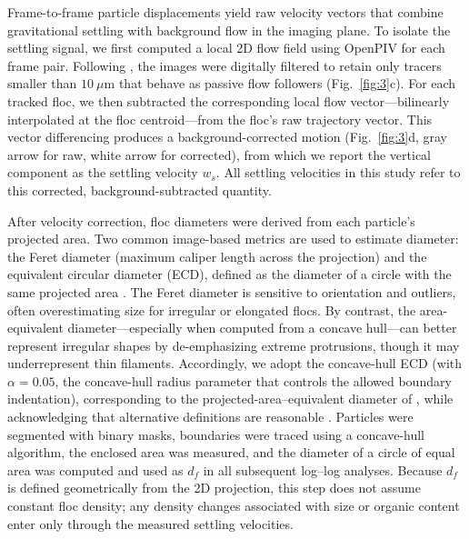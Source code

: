 \documentclass{agujournal2019}
\providecommand{\DIFadd}[1]{{\protect\color{blue} #1}} %
\providecommand{\DIFdel}[1]{{\protect\color{red}\sout{#1}}} %
\providecommand{\DIFaddbegin}{\protect\color{blue}} %
\providecommand{\DIFaddend}{\protect\color{black}} %
\providecommand{\DIFdelbegin}{\protect\color{red}} %
\providecommand{\DIFdelend}{\protect\color{black}} %
\newcommand{\DIFscaledelfig}{0.5}
\newlength{\DIFdelgraphicswidth} %
\newlength{\DIFdelgraphicsheight} %
\newcommand{\DIFaddincludegraphics}[2][]{{\color{blue}\fbox{\DIFOincludegraphics[#1]{#2}}}} %
\newcommand{\DIFdelincludegraphics}[2][]{%
\sbox{\DIFdelgraphicsbox}{\DIFOincludegraphics[#1]{#2}}%
\settoboxwidth{\DIFdelgraphicswidth}{\DIFdelgraphicsbox} %
\settoboxtotalheight{\DIFdelgraphicsheight}{\DIFdelgraphicsbox} %
\scalebox{\DIFscaledelfig}{%
\parbox[b]{\DIFdelgraphicswidth}{\usebox{\DIFdelgraphicsbox}\\[-\baselineskip] \rule{\DIFdelgraphicswidth}{0em}}\llap{\resizebox{\DIFdelgraphicswidth}{\DIFdelgraphicsheight}{%
\setlength{\unitlength}{\DIFdelgraphicswidth}%
\begin{picture}(1,1)%
\thicklines\linethickness{2pt} %
{\color[rgb]{1,0,0}\put(0,0){\framebox(1,1){}}}%
{\color[rgb]{1,0,0}\put(0,0){\line( 1,1){1}}}%
{\color[rgb]{1,0,0}\put(0,1){\line(1,-1){1}}}%
\end{picture}%
}\hspace*{3pt}}} %
} %
\DeclareRobustCommand{\DIFaddbegin}{\DIFOaddbegin \let\includegraphics\DIFaddincludegraphics} %
\DeclareRobustCommand{\DIFaddend}{\DIFOaddend \let\includegraphics\DIFOincludegraphics} %
\DeclareRobustCommand{\DIFdelbegin}{\DIFOdelbegin \let\includegraphics\DIFdelincludegraphics} %
\DeclareRobustCommand{\DIFdelend}{\DIFOaddend \let\includegraphics\DIFOincludegraphics} %
\begin{document}
Frame-to-frame particle displacements yield raw \DIFdelbegin \DIFdel{two-dimensional }\DIFdelend \DIFaddbegin \DIFadd{2D }\DIFaddend velocity vectors that combine gravitational settling with background flow in the imaging plane. To isolate the settling signal, we first computed a local 2D flow field using OpenPIV \cite{liberzon2021openpiv} for each frame pair. Following , the images were digitally filtered to retain only tracers smaller than $10~\mu\mathrm{m}$ that behave as passive flow followers (Fig.~\ref{fig:3}c). For each tracked floc, we then subtracted the corresponding local flow vector---bilinearly interpolated at the floc centroid---from the floc's raw trajectory vector. This vector differencing produces a background-corrected motion (Fig.~\ref{fig:3}d, gray arrow for raw, white arrow for corrected), from which we report the vertical component as the settling velocity \(w_s\). All settling velocities in this study refer to this corrected, background-subtracted quantity.

After velocity correction, floc diameters were derived from each particle's projected area. Two common image-based metrics are used to estimate diameter: the Feret diameter (maximum caliper length across the projection) and the equivalent circular diameter (ECD), defined as the diameter of a circle with the same projected area \cite{jarvis2005measuring, smith2015image}. The Feret diameter is sensitive to orientation and outliers, often overestimating size for irregular or elongated flocs. By contrast, the area-equivalent diameter---especially when computed from a concave hull---can better represent irregular shapes by de-emphasizing extreme protrusions, though it may underrepresent thin filaments. Accordingly, we adopt the concave-hull ECD (with $\alpha = 0.05$, the concave-hull radius parameter that controls the allowed boundary indentation), corresponding to the projected-area--equivalent diameter of , while acknowledging that alternative definitions are reasonable \cite{jarvis2005measuring}. Particles were segmented with binary masks, boundaries were traced using a concave-hull algorithm, the enclosed area was measured, and the diameter of a circle of equal area was computed and used as \(d_f\) in all subsequent log--log analyses. Because $d_f$ is defined geometrically from the 2D projection, this step does not assume constant floc density; any density changes associated with size or organic content enter only through the measured settling velocities.
\end{document}
